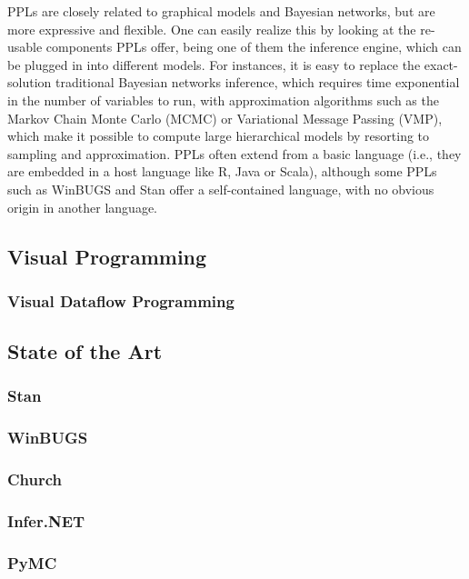 \begin{itemsize}
PPLs are closely related to graphical models and Bayesian networks, but are more
expressive and flexible. One can easily realize this by looking at the re-usable
components PPLs offer, being one of them the inference engine, which can be
plugged in into different models. For instances, it is easy to replace the
exact-solution traditional Bayesian networks inference, which requires time
exponential in the number of variables to run, with approximation algorithms
such as the Markov Chain Monte Carlo (MCMC) or Variational Message Passing
(VMP), which make it possible to compute large hierarchical models by resorting
to sampling and approximation. PPLs often extend from a basic language (i.e.,
they are embedded in a host language like R, Java or Scala), although some PPLs
such as WinBUGS and Stan offer a self-contained language, with no obvious origin
in another language.

\subsection{Visual Programming}

\subsubsection{Visual Dataflow Programming}

\subsection{State of the Art}

\subsubsection{Stan}

\subsubsection{WinBUGS}

\subsubsection{Church}

\subsubsection{Infer.NET}

\subsubsection{PyMC}


\end{itemsize}
